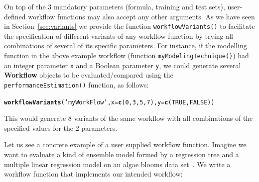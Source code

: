 \documentclass[10pt,a4paper]{article}\usepackage[]{graphicx}\usepackage[]{color}
\makeatletter
\newcommand{\hlnum}[1]{\textcolor[rgb]{0.686,0.059,0.569}{#1}}%
\newcommand{\hlstr}[1]{\textcolor[rgb]{0.192,0.494,0.8}{#1}}%
\newcommand{\hlstd}[1]{\textcolor[rgb]{0.345,0.345,0.345}{#1}}%
\newcommand{\hlkwc}[1]{\textcolor[rgb]{0.333,0.667,0.333}{#1}}%
\newcommand{\hlkwd}[1]{\textcolor[rgb]{0.737,0.353,0.396}{\textbf{#1}}}%
\newenvironment{kframe}{%
 \def\at@end@of@kframe{}%
 \ifinner\ifhmode%
  \def\at@end@of@kframe{\end{minipage}}%
  \begin{minipage}{\columnwidth}%
 \fi\fi%
 \def\FrameCommand##1{\hskip\@totalleftmargin \hskip-\fboxsep
 \colorbox{shadecolor}{##1}\hskip-\fboxsep
     \hskip-\linewidth \hskip-\@totalleftmargin \hskip\columnwidth}%
 \MakeFramed {\advance\hsize-\width
   \@totalleftmargin\z@ \linewidth\hsize
   \@setminipage}}%
 {\par\unskip\endMakeFramed%
 \at@end@of@kframe}
\newenvironment{knitrout}{}{} %
\makeatother
\begin{document}
On top of the 3 mandatory parameters (formula, training and test sets), user-defined workflow functions may also accept any other arguments. As we have seen in Section~\ref{sec:variants} we provide
the function \texttt{workflowVariants()} to facilitate the specification of
different variants of any workflow function by trying all combinations
of several of its specific parameters. For instance, if the modelling
function in the above example workflow (function
\texttt{myModelingTechnique()}) had an integer parameter \texttt{x}
and a Boolean parameter \texttt{y}, we could generate several
\textbf{Workflow} objects to be evaluated/compared using the
\texttt{performanceEstimation()} function, as follows:

\begin{knitrout}\footnotesize
{}\color{fgcolor}\begin{kframe}
\begin{alltt}
\hlkwd{workflowVariants}\hlstd{(}\hlstr{'myWorkFlow'}\hlstd{,}\hlkwc{x}\hlstd{=}\hlkwd{c}\hlstd{(}\hlnum{0}\hlstd{,}\hlnum{3}\hlstd{,}\hlnum{5}\hlstd{,}\hlnum{7}\hlstd{),}\hlkwc{y}\hlstd{=}\hlkwd{c}\hlstd{(}\hlnum{TRUE}\hlstd{,}\hlnum{FALSE}\hlstd{))}
\end{alltt}
\end{kframe}
\end{knitrout}

This would generate 8 variants of the same workflow with all
combinations of the specified values for the 2 parameters.  

Let us see a concrete example of a user supplied workflow
function. Imagine we want to evaluate a kind of ensemble model formed
by a regression tree and a multiple linear regression model on an
algae blooms data set~\cite{Tor10}.  We write a workflow function that implements our intended workflow:
\end{document}
